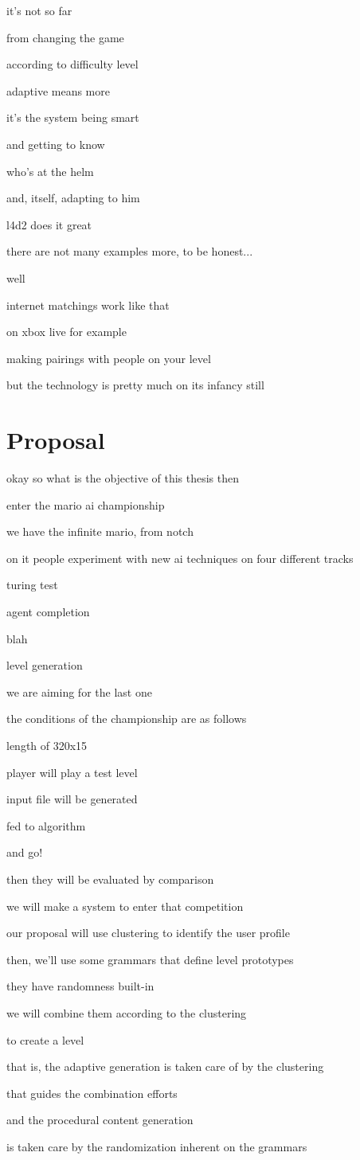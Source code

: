 it's not so far

from changing the game

according to difficulty level

adaptive means more

it's the system being smart

and getting to know

who's at the helm

and, itself, adapting to him

l4d2 does it great

there are not many examples more, to be honest...

well

internet matchings work like that

on xbox live for example

making pairings with people on your level

but the technology is pretty much on its infancy still

\section{Proposal}

okay so what is the objective of this thesis then

enter the mario ai championship

we have the infinite mario, from notch

on it people experiment with new ai techniques on four different tracks

turing test

agent completion

blah

level generation

we are aiming for the last one

the conditions of the championship are as follows

length of 320x15

player will play a test level

input file will be generated

fed to algorithm

and go!

then they will be evaluated by comparison

we will make a system to enter that competition

our proposal will use clustering to identify the user profile

then, we'll use some grammars that define level prototypes

they have randomness built-in

we will combine them according to the clustering

to create a level

that is, the adaptive generation is taken care of by the clustering

that guides the combination efforts

and the procedural content generation

is taken care by the randomization inherent on the grammars
